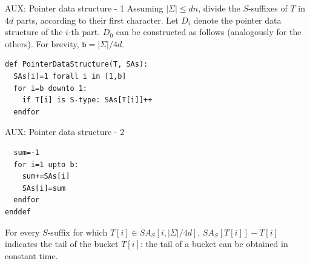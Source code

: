 \documentclass{beamer}
\begin{document}
  \begin{frame}[fragile]{AUX: Pointer data structure - 1}\label{AUX5.pointer}
    Assuming $|\Sigma| \le dn$, divide the $S$-suffixes of $T$ in $4d$ parts, according to their first character. Let $D_i$ denote the pointer data structure of the $i$-th part. $D_0$ can be constructed as follows (analogously for the others). For brevity, $\texttt{b} = |\Sigma|/4d$.

    \begin{lstlisting}
def PointerDataStructure(T, SAs):
  SAs[i]=1 forall i in [1,b]
  for i=b downto 1:
    if T[i] is S-type: SAs[T[i]]++
  endfor
    \end{lstlisting}

  \end{frame}

  \begin{frame}[fragile]{AUX: Pointer data structure - 2}
    \begin{lstlisting}
  sum=-1
  for i=1 upto b:
    sum+=SAs[i]
    SAs[i]=sum
  endfor
enddef
    \end{lstlisting}

    For every $S$-suffix for which $T[i]\in SA_S[i,|\Sigma|/4d]$, $SA_S[T[i]] - T[i]$ indicates the tail of the bucket $T[i]$: the tail of a bucket can be obtained in constant time. \hyperlink{5}{\beamerbutton{$\hookleftarrow$}}

  \end{frame}
\end{document}
